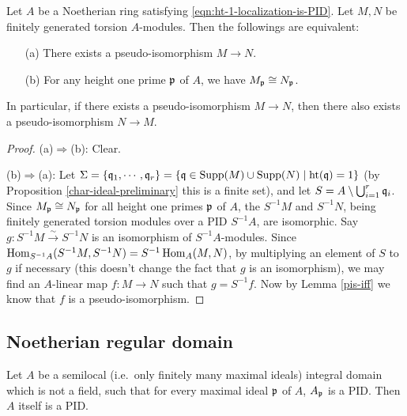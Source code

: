 \begin{prop}
\label{pis-symm}
Let $A$ be a Noetherian ring satisfying \eqref{eqn:ht-1-localization-is-PID}.
Let $M,N$ be finitely generated torsion $A$-modules.
Then the followings are equivalent:
\begin{itemize}
\item[(a)]
There exists a pseudo-isomorphism $M\to N$.
\item[(b)]
For any height one prime ${\mathfrak{p}}$ of $A$, we have $M_{\mathfrak{p}}\cong N_{\mathfrak{p}}$.
\end{itemize}
In particular, if there exists a pseudo-isomorphism $M\to N$,
then there also exists a pseudo-isomorphism $N\to M$.
\end{prop}

\begin{proof}
(a)$\Rightarrow$(b): Clear.

(b)$\Rightarrow$(a): Let $\Sigma=\{{\mathfrak{q}}_1,\cdots,{\mathfrak{q}}_r\}
=\{{\mathfrak{q}}\in{\mathrm{Supp}}(M)\cup{\mathrm{Supp}}(N)\mid{\mathrm{ht}}({\mathfrak{q}})=1\}$
(by Proposition \ref{char-ideal-preliminary} this is a finite set),
and let $S=A\setminus\bigcup_{i=1}^r{\mathfrak{q}}_i$.
Since $M_{\mathfrak{p}}\cong N_{\mathfrak{p}}$ for all height one primes ${\mathfrak{p}}$ of $A$,
the $S^{-1}M$ and $S^{-1}N$, being finitely generated torsion modules over
a PID $S^{-1}A$, are isomorphic. Say $g:S^{-1}M\xrightarrow\sim S^{-1}N$
is an isomorphism of $S^{-1}A$-modules.
Since $\operatorname{Hom}_{S^{-1}A}(S^{-1}M,S^{-1}N)=S^{-1}\operatorname{Hom}_A(M,N)$,
by multiplying an element of $S$ to $g$ if necessary
(this doesn't change the fact that $g$ is an isomorphism), we may find
an $A$-linear map $f:M\to N$
such that $g=S^{-1}f$.
Now by Lemma \ref{pis-iff} we know that $f$ is a pseudo-isomorphism.
\end{proof}

\subsection{Noetherian regular domain}

\begin{lem}
\label{semilocal-PID}
Let $A$ be a semilocal (i.e.~only finitely many maximal ideals)
integral domain which is not a field,
such that for every maximal ideal ${\mathfrak{p}}$ of $A$, $A_{\mathfrak{p}}$ is a PID.
Then $A$ itself is a PID.
\end{lem}

